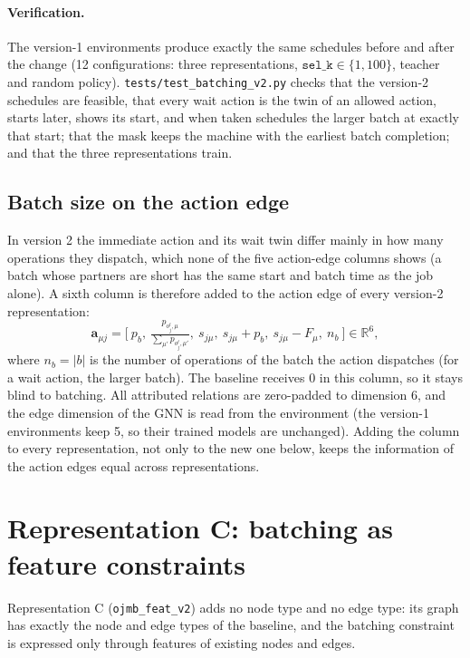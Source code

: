 \documentclass[11pt,a4paper]{article}
\newcommand{\R}{\mathbb{R}}
\begin{document}
\paragraph{Verification.} The version-1 environments produce exactly the same schedules
before and after the change (12 configurations: three representations, $\texttt{sel\_k}\in
\{1,100\}$, teacher and random policy). \texttt{tests/test\_batching\_v2.py} checks that the
version-2 schedules are feasible, that every wait action is the twin of an allowed action,
starts later, shows its start, and when taken schedules the larger batch at exactly that
start; that the mask keeps the machine with the earliest batch completion; and that the
three representations train.

\subsection{Batch size on the action edge}
In version 2 the immediate action and its wait twin differ mainly in how many operations
they dispatch, which none of the five action-edge columns shows (a batch whose partners are
short has the same start and batch time as the job alone). A sixth column is therefore added
to the action edge of every version-2 representation:
\begin{equation}
  \mathbf{a}_{\mu j}=\bigl[\ p_b,\ \tfrac{p_{o_j^t,\mu}}{\sum_{\mu'}p_{o_j^t,\mu'}},\
  s_{j\mu},\ s_{j\mu}+p_b,\ s_{j\mu}-F_\mu,\ n_{b}\ \bigr]\in\R^6,
\end{equation}
where $n_b=|b|$ is the number of operations of the batch the action dispatches (for a wait
action, the larger batch). The baseline receives $0$ in this column, so it stays blind to
batching. All attributed relations are zero-padded to dimension 6, and the edge dimension of
the GNN is read from the environment (the version-1 environments keep 5, so their trained
models are unchanged). Adding the column to every representation, not only to the new one
below, keeps the information of the action edges equal across representations.

\section{Representation C: batching as feature constraints}
\label{sec:repC}

Representation C (\texttt{ojmb\_feat\_v2}) adds no node type and no edge type: its graph has
exactly the node and edge types of the baseline, and the batching constraint is expressed only
through features of existing nodes and edges.
\end{document}
